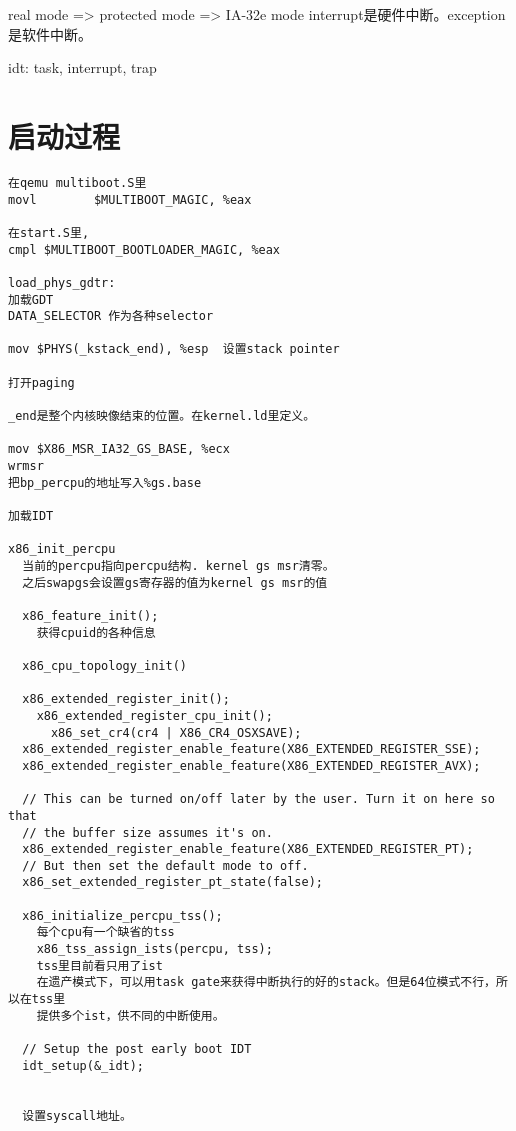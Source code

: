 real mode => protected mode => IA-32e mode
interrupt是硬件中断。exception是软件中断。

idt: task, interrupt, trap


\section{启动过程}


\begin{verbatim}
在qemu multiboot.S里
movl		$MULTIBOOT_MAGIC, %eax

在start.S里,
cmpl $MULTIBOOT_BOOTLOADER_MAGIC, %eax

load_phys_gdtr:
加载GDT
DATA_SELECTOR 作为各种selector

mov $PHYS(_kstack_end), %esp  设置stack pointer

打开paging

_end是整个内核映像结束的位置。在kernel.ld里定义。

mov $X86_MSR_IA32_GS_BASE, %ecx
wrmsr
把bp_percpu的地址写入%gs.base

加载IDT

x86_init_percpu
  当前的percpu指向percpu结构. kernel gs msr清零。
  之后swapgs会设置gs寄存器的值为kernel gs msr的值

  x86_feature_init();
    获得cpuid的各种信息

  x86_cpu_topology_init()

  x86_extended_register_init();
    x86_extended_register_cpu_init();
      x86_set_cr4(cr4 | X86_CR4_OSXSAVE);
  x86_extended_register_enable_feature(X86_EXTENDED_REGISTER_SSE);
  x86_extended_register_enable_feature(X86_EXTENDED_REGISTER_AVX);

  // This can be turned on/off later by the user. Turn it on here so that
  // the buffer size assumes it's on.
  x86_extended_register_enable_feature(X86_EXTENDED_REGISTER_PT);
  // But then set the default mode to off.
  x86_set_extended_register_pt_state(false);

  x86_initialize_percpu_tss();
    每个cpu有一个缺省的tss
    x86_tss_assign_ists(percpu, tss);
    tss里目前看只用了ist
    在遗产模式下，可以用task gate来获得中断执行的好的stack。但是64位模式不行，所以在tss里
    提供多个ist，供不同的中断使用。

  // Setup the post early boot IDT
  idt_setup(&_idt);


  设置syscall地址。



\end{verbatim}

